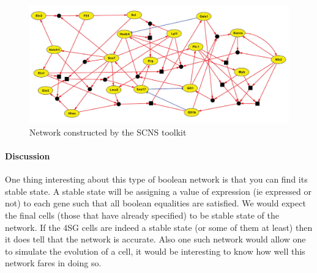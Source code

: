 \documentclass[a4paper,12pt]{book}
\theoremstyle{break}
\begin{document}
\begin{figure}[h!]
	\centering
	\includegraphics[width = \linewidth]{../Biblio/images/pap_network.png}
	\caption{Network constructed by the SCNS toolkit}
	\label{fig:scns}
\end{figure}

\paragraph{Discussion} One thing interesting about this type of boolean network is that you can find its stable state. A stable state will be assigning a value of expression (ie expressed or not) to each gene such that all boolean equalities are satisfied. We would expect the final cells (those that have already specified) to be stable state of the network. If the 4SG cells are indeed a stable state (or some of them at least) then it does tell that the network is accurate. Also one such network would allow one to simulate the evolution of a cell, it would be interesting to know how well this network fares in doing so.



	
\end{document}
